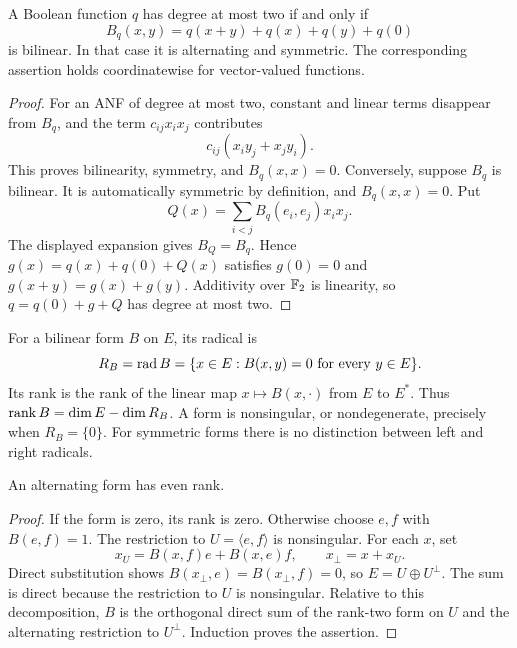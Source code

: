 \begin{lemma}\label{lem:polar}
A Boolean function $q$ has degree at most two if and only if
\[
B_q(x,y)=q(x+y)+q(x)+q(y)+q(0)
\]
is bilinear. In that case it is alternating and symmetric. The corresponding assertion holds coordinatewise for vector-valued functions.
\end{lemma}
\begin{proof}
For an ANF of degree at most two, constant and linear terms disappear from $B_q$, and the term $c_{ij}x_ix_j$ contributes
\[
c_{ij}(x_i y_j+x_j y_i).
\]
This proves bilinearity, symmetry, and $B_q(x,x)=0$. Conversely, suppose $B_q$ is bilinear. It is automatically symmetric by definition, and $B_q(x,x)=0$. Put
\[
Q(x)=\sum_{i<j}B_q(e_i,e_j)x_ix_j.
\]
The displayed expansion gives $B_Q=B_q$. Hence $g(x)=q(x)+q(0)+Q(x)$ satisfies $g(0)=0$ and $g(x+y)=g(x)+g(y)$. Additivity over $\mathbb F_2$ is linearity, so $q=q(0)+g+Q$ has degree at most two.
\end{proof}

For a bilinear form $B$ on $E$, its radical is
\[
R_B=\operatorname{rad} B=\{x\in E:B(x,y)=0\text{ for every }y\in E\}.
\]
Its rank is the rank of the linear map $x\mapsto B(x,\cdot)$ from $E$ to $E^*$. Thus $\operatorname{rank} B=\dim E-\dim R_B$. A form is nonsingular, or nondegenerate, precisely when $R_B=\{0\}$. For symmetric forms there is no distinction between left and right radicals.

\begin{lemma}\label{lem:even-rank}
An alternating form has even rank.
\end{lemma}
\begin{proof}
If the form is zero, its rank is zero. Otherwise choose $e,f$ with $B(e,f)=1$. The restriction to $U=\langle e,f\rangle$ is nonsingular. For each $x$, set
\[
x_U=B(x,f)e+B(x,e)f,
\qquad x_\perp=x+x_U.
\]
Direct substitution shows $B(x_\perp,e)=B(x_\perp,f)=0$, so $E=U\oplus U^\perp$. The sum is direct because the restriction to $U$ is nonsingular. Relative to this decomposition, $B$ is the orthogonal direct sum of the rank-two form on $U$ and the alternating restriction to $U^\perp$. Induction proves the assertion.
\end{proof}

